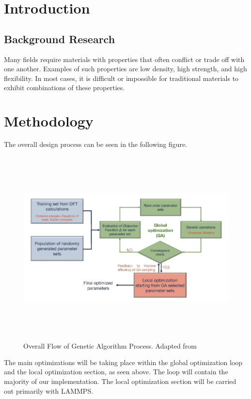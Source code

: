 \documentclass[letterpaper, 12pt]{article}
\begin{document}
\begin{flushleft}

\section*{Introduction}

\subsection*{Background Research}
Many fields require materials with properties that often conflict or trade off with one another.  Examples of such properties are low density, high strength, and high flexibility.  In most cases, it is difficult or impossible for traditional materials to exhibit combinations of these properties.

\section*{Methodology}
 The overall design process can be seen in the following figure.

 \begin{figure}[H]
 	\includegraphics[width=\linewidth,height=10cm,keepaspectratio]{flowchart.png}
 	\caption[Overall Flow of Genetic Algorithm Process]{Overall Flow of Genetic Algorithm Process. Adapted from \cite{C7NR06038F}}
 	\label{fig:arch}
 \end{figure}
 The main optimizations will be taking place within the global optimization loop and the local optimization section, as seen above. The loop will contain the majority of our implementation.  The local optimization section will be carried out primarily with LAMMPS.\\
 

\end{flushleft}
\end{document}

